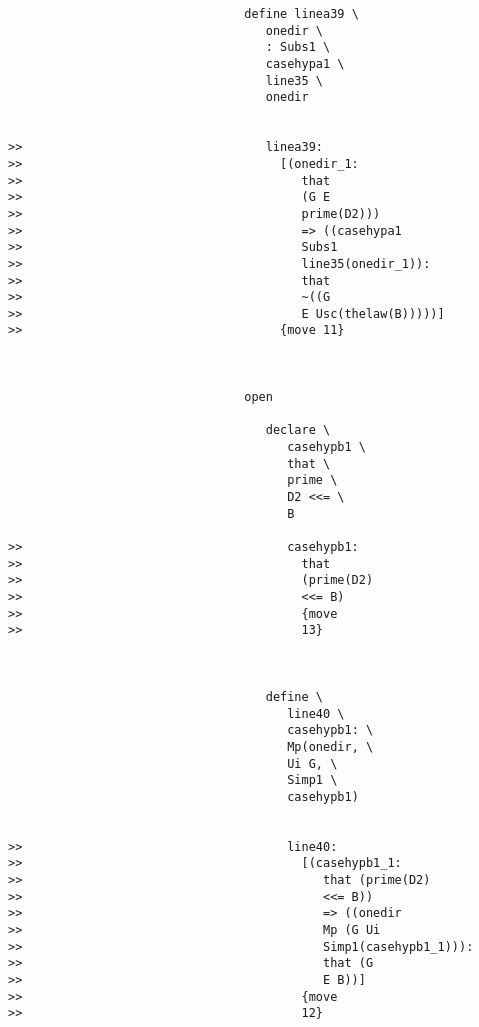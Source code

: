 \documentclass[12pt]{article}
\begin{document}
\begin{verbatim}
                                 define linea39 \
                                    onedir \
                                    : Subs1 \
                                    casehypa1 \
                                    line35 \
                                    onedir


>>                                  linea39:
>>                                    [(onedir_1:
>>                                       that
>>                                       (G E
>>                                       prime(D2)))
>>                                       => ((casehypa1
>>                                       Subs1
>>                                       line35(onedir_1)):
>>                                       that
>>                                       ~((G
>>                                       E Usc(thelaw(B)))))]
>>                                    {move 11}



                                 open

                                    declare \
                                       casehypb1 \
                                       that \
                                       prime \
                                       D2 <<= \
                                       B

>>                                     casehypb1:
>>                                       that
>>                                       (prime(D2)
>>                                       <<= B)
>>                                       {move
>>                                       13}



                                    define \
                                       line40 \
                                       casehypb1: \
                                       Mp(onedir, \
                                       Ui G, \
                                       Simp1 \
                                       casehypb1)


>>                                     line40:
>>                                       [(casehypb1_1:
>>                                          that (prime(D2)
>>                                          <<= B))
>>                                          => ((onedir
>>                                          Mp (G Ui
>>                                          Simp1(casehypb1_1))):
>>                                          that (G
>>                                          E B))]
>>                                       {move
>>                                       12}




\end{verbatim}
\end{document}
